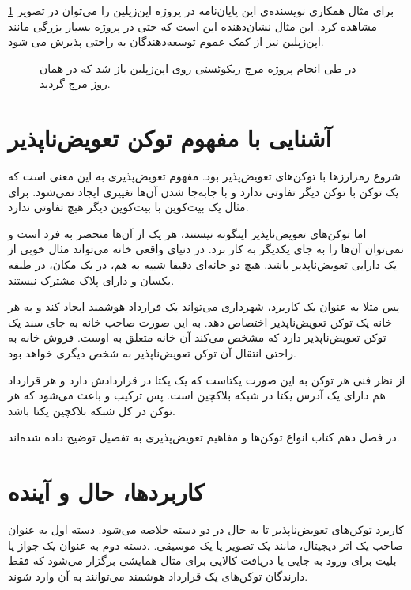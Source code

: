 برای مثال همکاری
نویسنده‌ی این پایان‌نامه در پروژه اپن‌زپلین را می‌توان در تصویر
\ref{fig:zeppelin-merge-req}
مشاهده کرد.
این مثال نشان‌دهنده این است که حتی در پروژه بسیار بزرگی مانند اپن‌زپلین نیز
از کمک عموم توسعه‌دهندگان به راحتی پذیرش می شود.

\begin{figure}[H]
\centerline{}
\caption{در طی انجام پروژه مرج ریکوئستی روی اپن‌زپلین باز شد که در همان روز مرج گردید.}
\label{fig:zeppelin-merge-req}
\end{figure}


\section{آشنایی با مفهوم توکن تعویض‌ناپذیر}
شروع رمزارزها با توکن‌های تعویض‌پذیر بود.
مفهوم تعویض‌پذیری به این معنی است که یک توکن با توکن دیگر تفاوتی ندارد
و با جابه‌جا شدن آن‌ها تغییری ایجاد نمی‌شود.
برای مثال یک بیت‌کوین با بیت‌کوین دیگر هیچ تفاوتی ندارد.

اما توکن‌های تعویض‌ناپذیر اینگونه نیستند،
هر یک از آن‌ها منحصر به فرد است و نمی‌توان آن‌ها را به جای یکدیگر به کار برد.
در دنیای واقعی خانه می‌تواند مثال خوبی از یک دارایی تعویض‌ناپذیر باشد.
هیچ دو خانه‌ای دقیقا شبیه به هم، در یک مکان، در طبقه یکسان و دارای پلاک مشترک نیستند.

پس مثلا به عنوان یک کاربرد،
شهرداری می‌تواند یک قرارداد هوشمند ایجاد کند
و به هر خانه یک توکن تعویض‌ناپذیر اختصاص دهد.
به این صورت صاحب خانه به جای سند یک توکن تعویض‌ناپذیر دارد
که مشخص می‌کند آن خانه متعلق به اوست.
فروش خانه به راحتی انتقال آن توکن تعویض‌ناپذیر به شخص دیگری خواهد بود.

از نظر فنی هر توکن به این صورت یکتاست که یک
یکتا در قراردادش دارد و هر قرارداد هم دارای یک آدرس یکتا در شبکه بلاکچین است. پس ترکیب
و
باعث می‌شود که هر توکن در کل شبکه بلاکچین یکتا باشد.

در فصل دهم کتاب
\cite{MasteringEthereum}
انواع توکن‌ها و مفاهیم تعویض‌پذیری به تفصیل توضیح داده شده‌اند.


\section{کاربردها، حال و آینده}
کاربرد توکن‌های تعویض‌ناپذیر تا به حال در دو دسته خلاصه می‌شود.
دسته اول به عنوان صاحب یک اثر دیجیتال،
مانند یک تصویر یا یک موسیقی.
.دسته دوم به عنوان یک جواز یا بلیت برای ورود به جایی یا دریافت کالایی
برای مثال همایشی برگزار می‌شود که فقط دارندگان توکن‌های یک قرارداد هوشمند می‌توانند به آن وارد شوند.

